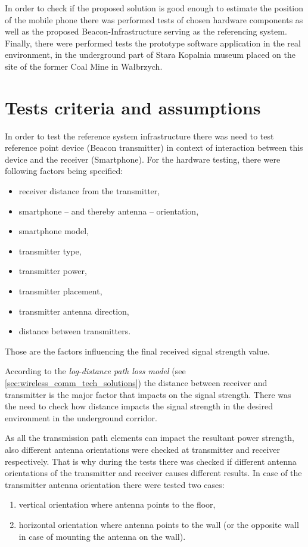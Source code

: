 \documentclass[../main.tex]{subfiles}
\begin{document}
In order to check if the proposed solution is good enough to estimate the position of the mobile phone there was performed tests of chosen hardware components as well as the proposed Beacon-Infrastructure serving as the referencing system. Finally, there were performed tests the prototype software application in the real environment, in the underground part of Stara Kopalnia museum placed on the site of the former Coal Mine in Wałbrzych.

\section{Tests criteria and assumptions} %
\label{sec:tests_criteria_and_assumptions}

In order to test the reference system infrastructure there was need to test reference point device (Beacon transmitter) in context of interaction between this device and the receiver (Smartphone). For the hardware testing, there were following factors being specified:
\begin{itemize}
	\item receiver distance from the transmitter,
	\item smartphone -- and thereby antenna -- orientation,
	\item smartphone model,
	\item transmitter type,
	\item transmitter power,
	\item transmitter placement,
	\item transmitter antenna direction,
	\item distance between transmitters.
\end{itemize}

Those are the factors influencing the final received signal strength value.

According to the \textit{log-distance path loss model} \cite{RSSI_path_loss_prediction_model} (see \ref{sec:wireless_comm_tech_solutions}) the distance between receiver and transmitter is the major factor that impacts on the signal strength. There was the need to check how distance impacts the signal strength in the desired environment in the underground corridor.

As all the transmission path elements can impact the resultant power strength, also different antenna orientations were checked at transmitter and receiver respectively. That is why during the tests there was checked if different antenna orientations of the transmitter and receiver causes different results. In case of the transmitter antenna orientation there were tested two cases:
\begin{enumerate}
	\item vertical orientation where antenna points to the floor,
	\item horizontal orientation where antenna points to the wall (or the opposite wall in case of mounting the antenna on the wall).
\end{enumerate}
\end{document}
